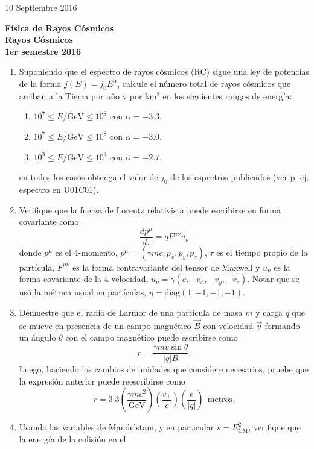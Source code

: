 \documentclass[11pt]{article}
\begin{document}
\pagestyle{empty}
{10 Septiembre 2016}
\begin{center}
	{\Large \bf Física de Rayos Cósmicos} \\
{ \large \bf Rayos Cósmicos} \\ {\bf 1er semestre 2016}
\end{center}

\setcounter{enumi}{0}      %
\begin{enumerate}
	\item Suponiendo que el espectro de rayos cósmicos (RC) sigue una ley de
		potencias de la forma $j(E)=j_0 E^{\alpha}$, calcule el número total de
		rayos cósmicos que arriban a la Tierra por año y por km$^2$ en los
		siguientes rangos de energía:
		\begin{enumerate}
			\item $10^{7} \leq E/\mathrm{GeV} \leq 10^{8}$ con $\alpha=-3.3$.
			\item $10^{7} \leq E/\mathrm{GeV} \leq 10^{8}$ con $\alpha=-3.0$.
			\item $10^{3} \leq E/\mathrm{GeV} \leq 10^{4}$ con $\alpha=-2.7$.
		\end{enumerate}
		en todos los casos obtenga el valor de $j_0$ de los espectros
		publicados (ver p. ej. espectro en U01C01).
	\item Verifique que la fuerza de Lorentz relativista puede escribirse en
		forma covariante como $$ \frac{dp^\mu}{d\tau} = q F^{\mu\nu} u_\nu$$
		donde $p^\mu$ es el 4-momento, $p^\mu = (\gamma m c, p_x, p_y, p_z)$,
		$\tau$ es el tiempo propio de la partícula, $F^{\mu\nu}$ es la forma
		contravariante del tensor de Maxwell y $u_\nu$ es la forma covariante
		de la 4-velocidad, $u_\nu= \gamma (c, -v_x, -v_y, -v_z)$. Notar que se
		usó la métrica usual en partículas, $\eta=\mathrm{diag}(1,-1,-1,-1)$.
	\item Demuestre que el radio de Larmor de una partícula de masa $m$ y
		carga $q$ que se mueve en presencia de un campo magnético $\vec B$ con
		velocidad $\vec v$ formando un ángulo $\theta$ con el campo magnético
		puede escribirse como $$ r= \frac{\gamma m v \sin \theta}{|q|
		B}.$$Luego, haciendo los cambios de unidades que considere necesarios,
		pruebe que la expresión anterior puede reescribirse como $$r = 3.3 
			\left ( \frac{\gamma m c^2}{\mathrm{GeV}} \right )
			\left ( \frac{v_\perp}{c} \right )
			\left ( \frac{e}{|q|} \right )
			\mathrm{\ \ metros}.
		$$
	\item Usando las variables de Mandelstam, y en particular
		$s=E_{\mathrm{CM}}^2$, verifique que la energía de la colisión en el

\end{enumerate}
\end{document}
